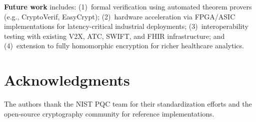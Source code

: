 \documentclass[conference,10pt]{IEEEtran}
\begin{document}
\textbf{Future work} includes: (1)~formal verification using automated theorem provers (e.g., CryptoVerif, EasyCrypt); (2)~hardware acceleration via FPGA/ASIC implementations for latency-critical industrial deployments; (3)~interoperability testing with existing V2X, ATC, SWIFT, and FHIR infrastructure; and (4)~extension to fully homomorphic encryption for richer healthcare analytics.

\section*{Acknowledgments}

The authors thank the NIST PQC team for their standardization efforts and the open-source cryptography community for reference implementations.

\balance



\end{document}
